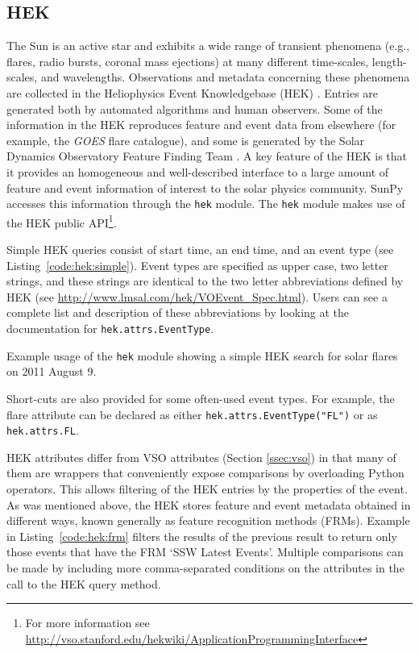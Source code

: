 \subsection{HEK}\label{ssec:hek}

The Sun is an active star and exhibits a wide range of transient phenomena 
(e.g., flares, radio bursts, coronal mass ejections) at many different time-scales, 
length-scales, and 
wavelengths. Observations and metadata concerning these phenomena are collected 
in the Heliophysics Event Knowledgebase (HEK) \citep{hurlburt2012}.  Entries are generated both by
automated algorithms and human observers.  Some of the information in the HEK 
reproduces feature and event data from elsewhere (for example, the \textit{GOES} flare catalogue),
and some is generated by the Solar Dynamics Observatory Feature Finding Team 
\citep{martens2012}.  A key feature of the HEK is that it
provides an homogeneous and well-described interface to a large amount of 
feature and event information of interest to the solar physics community. SunPy 
accesses this information through the \texttt{hek} module.  The \texttt{hek} module makes use of the 
HEK public API\footnote{For more information see \url{http://vso.stanford.edu/hekwiki/ApplicationProgrammingInterface}}.

Simple HEK queries consist of start time, an end time, and an event type 
(see Listing~\ref{code:hek:simple}). Event types are specified as upper case, 
two letter strings, and these strings are 
identical to the two letter abbreviations defined by HEK 
(see \url{http://www.lmsal.com/hek/VOEvent_Spec.html}). Users can see a
complete list and description of these abbreviations by looking at the documentation
for \texttt{hek.attrs.EventType}.

\begin{listing}[H]
\caption{Example usage of the \texttt{hek} module showing a simple HEK search for solar flares
on 2011 August 9.}
\label{code:hek:simple}
\end{listing}

Short-cuts are also provided for some often-used event types. For example, 
the flare attribute can be declared as either 
\texttt{hek.attrs.EventType("FL")} or as \texttt{hek.attrs.FL}. 

HEK attributes differ from VSO attributes (Section \ref{ssec:vso}) in that many 
of them are wrappers that conveniently expose comparisons by overloading Python 
operators. This allows filtering of the HEK entries by the properties of the 
event. As was mentioned above, the HEK stores feature and event metadata obtained 
in different ways, known generally as feature recognition methods (FRMs). 
Example in Listing~\ref{code:hek:frm} filters the results of the previous 
result to return only those events that have the FRM `SSW Latest Events'.  
Multiple comparisons can be made by including more comma-separated
conditions on the attributes in the call to the HEK query method.

